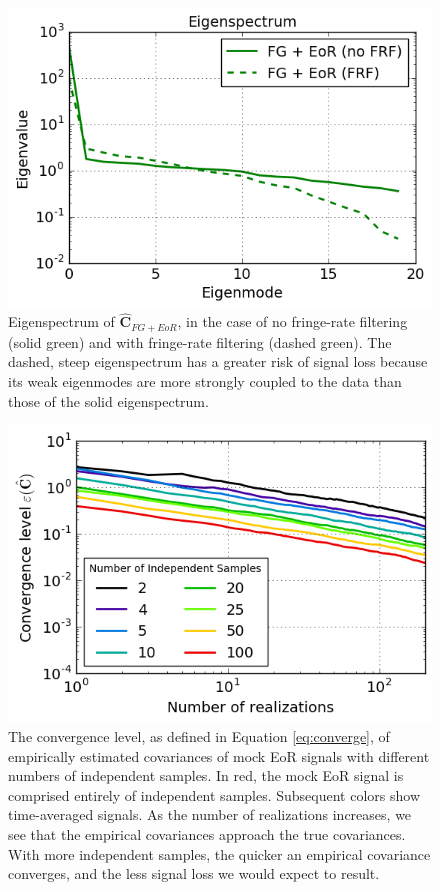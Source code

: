 \documentclass[preprint2,numberedappendix,tighten]{aastex6}  %
\begin{document}
\begin{figure}
	\centering
	\includegraphics[trim={0cm 0cm 0cm 0cm},clip,height=0.31\textwidth]{plots/toy_sigloss15.png}
	\caption{Eigenspectrum of $\widehat{\textbf{C}}_{FG+EoR}$, in the case of no fringe-rate filtering (solid green) and with fringe-rate filtering (dashed green). The dashed, steep eigenspectrum has a greater risk of signal loss because its weak eigenmodes are more strongly coupled to the data than those of the solid eigenspectrum.}
	\label{fig:toy_sigloss15}
\end{figure}

\begin{figure}
	\centering
	\includegraphics[width=\columnwidth]{plots/toy_sigloss16.png}
	\caption{The convergence level, as defined in Equation \eqref{eq:converge}, of empirically estimated covariances of mock EoR signals with different numbers of independent samples. In red, the mock EoR signal is comprised entirely of independent samples. Subsequent colors show time-averaged signals. As the number of realizations increases, we see that the empirical covariances approach the true covariances. With more independent samples, the quicker an empirical covariance converges, and the less signal loss we would expect to result.}
	\label{fig:toy_sigloss16}
\end{figure}
\end{document}
